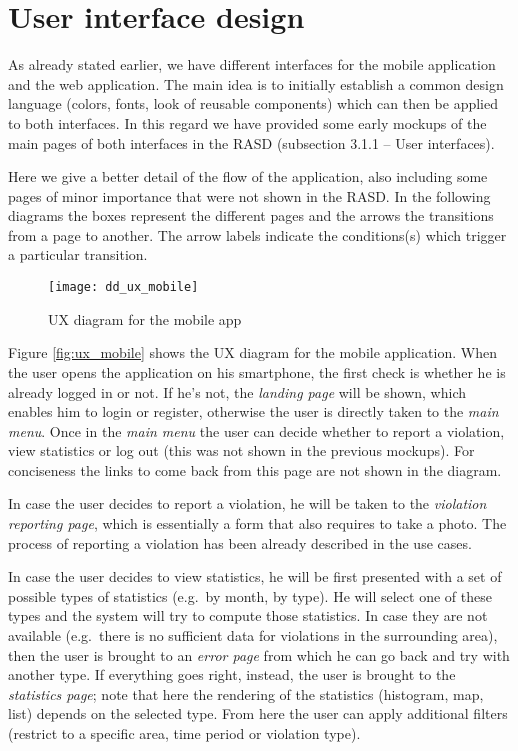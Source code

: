 \chapter{User interface design} \label{ch:ui}
\label{ch:ui_design}
As already stated earlier, we have different interfaces for the mobile
application and the web application.
The main idea is to initially establish a common design language (colors,
fonts, look of reusable components) which can then be applied to both
interfaces. In this regard we have provided some early mockups of the main pages
of both interfaces in the RASD (subsection 3.1.1 -- User interfaces).

Here we give a better detail of the flow of the application, also including
some pages of minor importance that were not shown in the RASD.
In the following diagrams the boxes represent the different pages and the
arrows the transitions from a page to another. The arrow labels indicate the
conditions(s) which trigger a particular transition.

\begin{figure}[ht]
    \centering
    \texttt{[image: dd\_ux\_mobile]}
    \caption{UX diagram for the mobile app}
    \label{fig:ux_mobile}
\end{figure}

Figure \vref{fig:ux_mobile} shows the UX diagram for the mobile application.
When the user opens the application on his smartphone, the first check is
whether he is already logged in or not. If he's not, the \emph{landing page}
will be shown, which enables him to login or register, otherwise the user
is directly taken to the \emph{main menu}.
Once in the \emph{main menu} the user can decide whether to report a violation,
view statistics or log out (this was not shown in the previous mockups).
For conciseness the links to come back from this page are not shown in the
diagram.

In case the user decides to report a violation, he will be taken to the
\emph{violation reporting page}, which is essentially a form that also
requires to take a photo. The process of reporting a violation has been already
described in the use cases.

In case the user decides to view statistics, he will be first presented
with a set of possible types of statistics (e.g.\ by month, by type).
He will select one of these types and the system will try to compute those
statistics. In case they are not available (e.g.\ there is no sufficient data
for violations in the surrounding area), then the user is brought to an
\emph{error page} from which he can go back and try with another type.
If everything goes right, instead, the user is brought to the
\emph{statistics page}; note that here the rendering of the statistics
(histogram, map, list) depends on the selected type. From here the user
can apply additional filters (restrict to a specific area, time period
or violation type).

